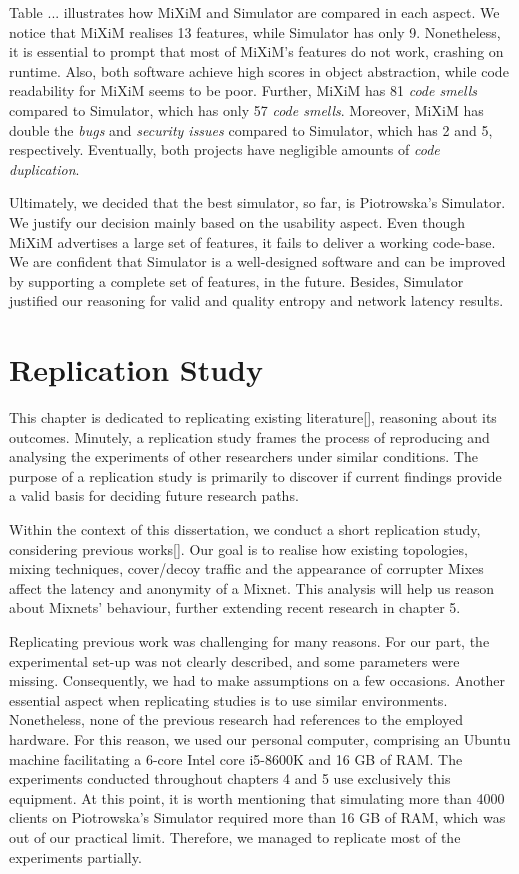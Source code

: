 \documentclass[logo,msc,cyber]{infthesis}   %
\begin{document}
Table ... illustrates how MiXiM and Simulator are compared in each aspect. We
notice that MiXiM realises 13 features, while Simulator has only 9. Nonetheless,
it is essential to prompt that most of MiXiM's features do not work, crashing on
runtime. Also, both software achieve high scores in object abstraction, while
code readability for MiXiM seems to be poor. Further, MiXiM has 81 \emph{code
smells} compared to Simulator, which  has only 57 \emph{code smells}. Moreover,
MiXiM has double the \emph{bugs} and \emph{security issues} compared to
Simulator, which has 2 and 5, respectively. Eventually, both projects have
negligible amounts of \emph{code duplication}.

Ultimately, we decided that the best simulator, so far, is Piotrowska's
Simulator. We justify our decision mainly based on the usability aspect. Even
though MiXiM advertises a large set of features, it fails to deliver a working
code-base. We are confident that Simulator is a well-designed software and can
be improved by supporting a complete set of features, in the future. Besides,
Simulator justified our reasoning for valid and quality entropy and network
latency results. 

\chapter{Replication Study}
This chapter is dedicated to replicating existing literature[], reasoning about
its outcomes. Minutely, a replication study frames the process of reproducing
and analysing the experiments of other researchers under similar conditions. The
purpose of a replication study is primarily to discover if current findings
provide a valid basis for deciding future research paths.

Within the context of this dissertation, we conduct a short replication study,
considering previous works[]. Our goal is to realise how existing topologies,
mixing techniques, cover/decoy traffic and the appearance of corrupter Mixes
affect the latency and anonymity of a Mixnet. This analysis will help us reason
about Mixnets' behaviour, further extending recent research in chapter 5.

Replicating previous work was challenging for many reasons. For our part, the
experimental set-up was not clearly described, and some parameters were missing.
Consequently, we had to make assumptions on a few occasions. Another essential
aspect when replicating studies is to use similar environments. Nonetheless,
none of the previous research had references to the employed hardware. For this
reason, we used our personal computer, comprising an Ubuntu machine facilitating
a 6-core Intel core i5-8600K and 16 GB of RAM. The experiments conducted
throughout chapters 4 and 5 use exclusively this equipment. At this point, it is
worth mentioning that simulating more than 4000 clients on Piotrowska's
Simulator required more than 16 GB of RAM, which was out of our practical limit.
Therefore, we managed to replicate most of the experiments partially. 
\end{document}
